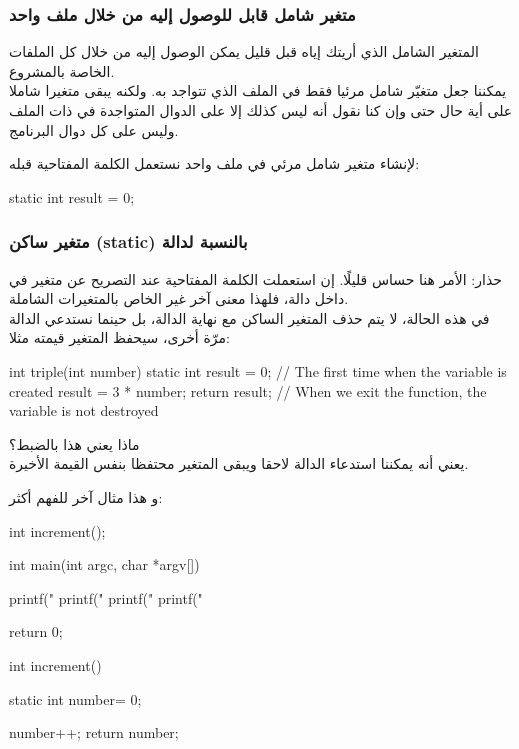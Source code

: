 \subsubsection{متغير شامل قابل للوصول إليه من خلال ملف واحد}

المتغير الشامل الذي أريتك إياه قبل قليل يمكن الوصول إليه من خلال كل الملفات الخاصة بالمشروع.\\
يمكننا جعل متغيّر شامل مرئيا فقط في الملف الذي تتواجد به. ولكنه يبقى متغيرا شاملا على أية حال حتى وإن كنا نقول أنه ليس كذلك إلا على الدوال المتواجدة في ذات الملف وليس على كل دوال البرنامج.

لإنشاء متغير شامل مرئي في ملف واحد نستعمل الكلمة المفتاحية
قبله:

\begin{Csource}
static int result = 0;
\end{Csource}

\subsubsection{متغير ساكن (\textenglish{static}) بالنسبة لدالة}

حذار: الأمر هنا حساس قليلًا. إن استعملت الكلمة المفتاحية
عند التصريح عن متغير في داخل دالة، فلهذا معنى آخر غير الخاص بالمتغيرات الشاملة.\\
في هذه الحالة، لا يتم حذف المتغير الساكن مع نهاية الدالة، بل حينما نستدعي الدالة مرّة أخرى، سيحفظ المتغير قيمته مثلا:
\begin{Csource}
int triple(int number)
{
	static int result = 0; // The first time when the variable is created
	result = 3 * number;
	return result;
} // When we exit the function, the variable is not destroyed
\end{Csource}
ماذا يعني هذا بالضبط؟\\
يعني أنه يمكننا استدعاء الدالة لاحقا ويبقى المتغير
محتفظا بنفس القيمة الأخيرة.

و هذا مثال آخر للفهم أكثر:
\begin{Csource}
int increment();

int main(int argc, char *argv[])
{
	printf("%
	printf("%
	printf("%
	printf("%

	return 0;
}

int increment()
{
	static int number= 0;

	number++;
	return number;
}
\end{Csource}

